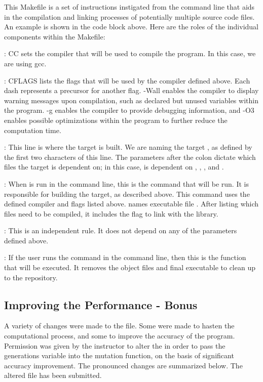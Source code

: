 \documentclass[12pt]{article}
\begin{document}
This Makefile is a set of instructions instigated from the command line that aids in the compilation and linking processes of potentially multiple source code files. An example is shown in the code block above. Here are the roles of the individual components within the Makefile:

: CC sets the compiler that will be used to compile the program. In this case, we are using gcc.

: CFLAGS lists the flags that will be used by the compiler defined above. Each dash represents a precursor for another flag.  -Wall enables the compiler to display warning messages upon compilation, such as declared but unused variables within the program. -g enables the compiler to provide debugging information, and -O3 enables possible optimizations within the program to further reduce the computation time.

: This line is where the target is built. We are naming the target , as defined by the first two characters of this line. The parameters after the colon dictate which files the target is dependent on; in this case,  is dependent on , , , and .

: When  is run in the command line, this is the command that will be run. It is responsible for building the target, as described above. This command uses the defined compiler and flags listed above.  names executable file . After listing which files need to be compiled, it includes the  flag to link with the  library.

: This is an independent rule. It does not depend on any of the parameters defined above.

: If the user runs the command  in the command line, then this is the function that will be executed. It removes the object files and final executable to clean up to the repository.
	
	\subsection{Improving the Performance - Bonus}
	
A variety of changes were made to the  file. Some were made to hasten the computational process, and some to improve the accuracy of the program. Permission was given by the instructor to alter the  in order to pass  the generations variable into the mutation function, on the basis of significant accuracy improvement. The pronounced changes are summarized below. The altered  file has been submitted.
\end{document}
